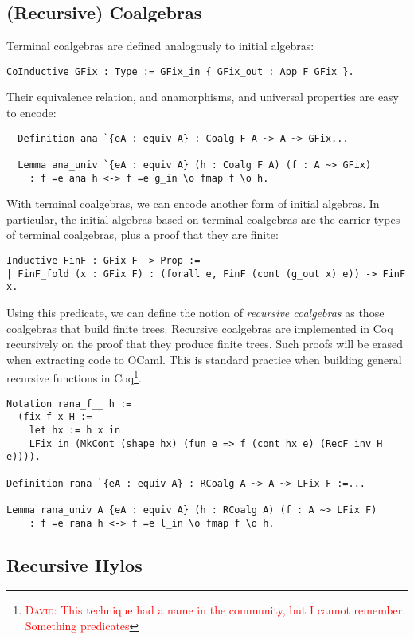\documentclass[a4paper, UKenglish, cleveref, autoref, thm-restate]{lipics-v2021}
\newcommand{\dcas}[1]{\textcolor{red}{\textsc{David}: #1}}
\begin{document}
\subsection{(Recursive) Coalgebras}

Terminal coalgebras are defined analogously to initial algebras:
\begin{verbatim}
CoInductive GFix : Type := GFix_in { GFix_out : App F GFix }.
\end{verbatim}

Their equivalence relation, and anamorphisms, and universal properties are
easy to encode:
\begin{verbatim}
  Definition ana `{eA : equiv A} : Coalg F A ~> A ~> GFix...

  Lemma ana_univ `{eA : equiv A} (h : Coalg F A) (f : A ~> GFix)
    : f =e ana h <-> f =e g_in \o fmap f \o h.
\end{verbatim}

With terminal coalgebras, we can encode another form of initial algebras. In
particular, the initial algebras based on terminal coalgebras are the carrier
types of terminal coalgebras, plus a proof that they are finite:

\begin{verbatim}
Inductive FinF : GFix F -> Prop :=
| FinF_fold (x : GFix F) : (forall e, FinF (cont (g_out x) e)) -> FinF x.
\end{verbatim}

Using this predicate, we can define the notion of \emph{recursive coalgebras}
as those coalgebras that build finite trees. Recursive coalgebras are
implemented in Coq recursively on the proof that they produce finite trees.
Such proofs will be erased when extracting code to OCaml. This is standard
practice when building general recursive functions in Coq\footnote{\dcas{This
technique had a name in the community, but I cannot remember. Something
predicates}}.
\begin{verbatim}
Notation rana_f__ h :=
  (fix f x H :=
    let hx := h x in
    LFix_in (MkCont (shape hx) (fun e => f (cont hx e) (RecF_inv H e)))).

Definition rana `{eA : equiv A} : RCoalg A ~> A ~> LFix F :=...

Lemma rana_univ A {eA : equiv A} (h : RCoalg A) (f : A ~> LFix F)
    : f =e rana h <-> f =e l_in \o fmap f \o h.
\end{verbatim}

\subsection{Recursive Hylos}
\end{document}
